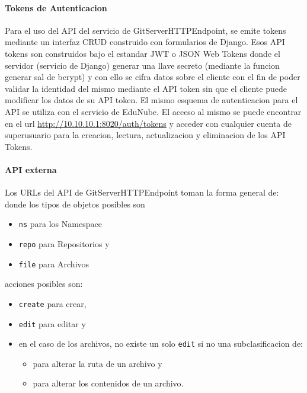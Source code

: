 \paragraph{Tokens de Autenticacion}
Para el uso del API del servicio de GitServerHTTPEndpoint, se emite tokens mediante un interfaz CRUD construido con formularios de Django. Esos API tokens son construidos bajo el estandar JWT o JSON Web Tokens donde el servidor (servicio de Django) generar una llave secreto (mediante la funcion generar sal de bcrypt) y con ello se cifra datos sobre el cliente con el fin de poder validar la identidad del mismo mediante el API token sin que el cliente puede modificar los datos de su API token. El mismo esquema de autenticacion para el API se utiliza con el servicio de EduNube. El acceso al mismo se puede encontrar en el url \url{http://10.10.10.1:8020/auth/tokens} y acceder con cualquier cuenta de superusuario para la creacion, lectura, actualizacion y eliminacion de los API Tokens.

\paragraph{API externa}
Los URLs del API de GitServerHTTPEndpoint toman la forma general de:\\
donde los tipos de objetos posibles son
\begin{itemize}
	\item \texttt{ns} para los Namespace
    \item \texttt{repo} para Repositorios y
    \item \texttt{file} para Archivos
\end{itemize}
acciones posibles son:
\begin{itemize}
	\item \texttt{create} para crear,
	\item \texttt{edit} para editar y
    \item en el caso de los archivos, no existe un solo \texttt{edit} si no una subclasificacion de:
    \begin{itemize}
    	\item %
        para alterar la ruta de un archivo y 
        \item %
        para alterar los contenidos de un archivo.
    \end{itemize}
\end{itemize}

